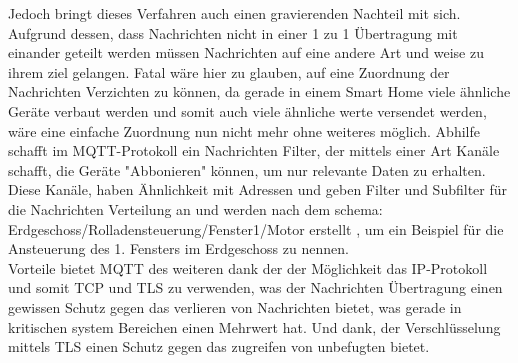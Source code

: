 Jedoch bringt dieses Verfahren auch einen gravierenden Nachteil mit sich. Aufgrund dessen, dass Nachrichten nicht in einer 1 zu 1 Übertragung mit einander geteilt werden müssen Nachrichten auf eine andere Art und weise zu ihrem ziel gelangen. Fatal wäre hier zu glauben, auf eine Zuordnung der Nachrichten Verzichten zu können, da gerade in einem Smart Home viele ähnliche Geräte verbaut werden und somit auch viele ähnliche werte versendet werden, wäre eine einfache Zuordnung nun nicht mehr ohne weiteres möglich.
Abhilfe schafft im MQTT-Protokoll ein Nachrichten Filter,  der mittels einer Art Kanäle schafft, die Geräte "Abbonieren" können, um nur relevante Daten zu erhalten\cite{b1}. Diese Kanäle, haben Ähnlichkeit mit  Adressen und geben Filter und Subfilter für die Nachrichten Verteilung an und werden nach dem schema: \textsf{Erdgeschoss/Rolladensteuerung/Fenster1/Motor} erstellt , um ein Beispiel für die Ansteuerung des 1. Fensters im Erdgeschoss zu nennen. \\
Vorteile bietet MQTT des weiteren dank der der Möglichkeit das IP-Protokoll und somit TCP und TLS zu verwenden, was der Nachrichten Übertragung einen gewissen Schutz gegen das verlieren von Nachrichten bietet, was gerade in kritischen system Bereichen einen Mehrwert hat. Und dank, der Verschlüsselung mittels TLS einen Schutz gegen das zugreifen von unbefugten bietet.
